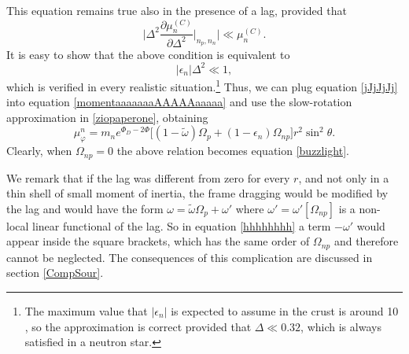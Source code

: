 \documentclass[usenatbib%
]{mnras}
\begin{document}
This equation remains true also in the presence of a lag, provided that
\begin{equation}
\bigg|\Delta^2 \dfrac{\partial \mu_n^{(C)}}{\partial \Delta^2} \bigg|_{n_p,n_n} \bigg| \ll \mu_n^{(C)}.
\end{equation}
It is easy to show that the above condition is equivalent to
\begin{equation}
|\epsilon_n| \Delta^2 \ll 1,
\end{equation}
which is verified in every realistic situation.\footnote{The maximum value that $|\epsilon_n|$ is expected to assume in the crust is around 10 \citep{chamel2012}, so the approximation is correct provided that $\Delta \ll 0.32$, which is always satisfied in a neutron star.}
Thus, we can plug equation \eqref{jJjJjJj} into equation \eqref{momentaaaaaaaAAAAAaaaaa} and use the slow-rotation approximation in \eqref{ziopaperone}, obtaining 
\begin{equation}\label{hhhhhhhh}
\mu^n_\varphi =  m_n e^{\Phi_D - 2 \Phi} \bigg[ (1-\tilde{\omega})\Omega_p + (1-\epsilon_n)\Omega_{np} \bigg] r^2 \sin^2 \theta.
\end{equation}
Clearly, when $\Omega_{np}=0$ the above relation becomes equation \eqref{buzzlight}. 

We remark that if the lag was different from zero for every $r$, and not only in a thin shell of small moment of inertia, the frame dragging would be modified by the lag and would have the form $\omega=\tilde{\omega}\Omega_p + \omega'$ where $\omega'=\omega'[\Omega_{np}]$ is a non-local linear functional of the lag. So in equation \eqref{hhhhhhhh} a term $-\omega'$ would appear inside the square brackets, which has the same order of $\Omega_{np}$ and therefore cannot be neglected. The consequences of this complication are discussed in section \ref{CompSour}.
\end{document}
